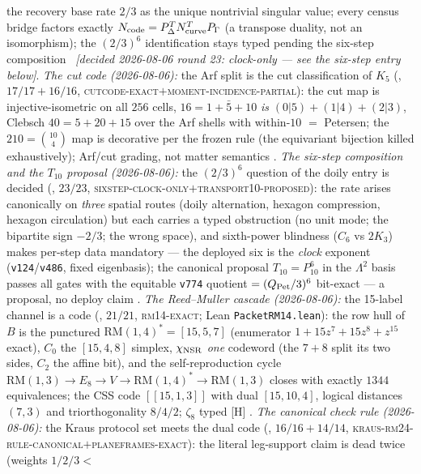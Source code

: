 \documentclass[11pt,a4paper]{article}
\theoremstyle{definition}
\begin{document}
\begin{keybox}
the recovery base rate $2/3$ as the unique nontrivial singular
value; every census bridge factors exactly
$N_{\rm code}=P_\Delta^{T}N_{\rm curve}^{T}P_\Gamma$ (a transpose
duality, not an isomorphism); the $(2/3)^6$ identification stays
typed pending the six-step composition \mE\ \emph{[decided
2026-08-06 round 23: clock-only --- see the six-step entry
below]}.
\emph{The cut code (2026-08-06):} the Arf split is the cut
classification of $K_5$
(, $17/17+16/16$,
\textsc{cutcode-exact}$+$\textsc{moment-incidence-partial}): the
cut map is injective-isometric on all $256$ cells,
$16=1+\bar5+10$ \emph{is} $(0|5)+(1|4)+(2|3)$, Clebsch
$40=5+20+15$ over the Arf shells with within-$10$ $=$ Petersen;
the $210=\binom{10}{4}$ map is decorative per the frozen rule
(the equivariant bijection killed exhaustively); Arf/cut grading,
not matter semantics \mE.
\emph{The six-step composition and the $T_{10}$ proposal
(2026-08-06):} the $(2/3)^6$ question of the doily entry is
decided
(, $23/23$,
\textsc{sixstep-clock-only}$+$\textsc{transport10-proposed}): the
rate arises canonically on \emph{three} spatial routes (doily
alternation, hexagon compression, hexagon circulation) but each
carries a typed obstruction (no unit mode; the bipartite sign
$-2/3$; the wrong space), and sixth-power blindness ($C_6$ vs
$2K_3$) makes per-step data mandatory --- the deployed six is the
\emph{clock} exponent (\texttt{v124}/\texttt{v486}, fixed
eigenbasis); the canonical proposal $T_{10}=P_{10}^6$ in the
$\Lambda^2$ basis passes all gates with the equitable
\texttt{v774} quotient $=(Q_{\rm Pet}/3)^6$ bit-exact --- a
proposal, no deploy claim \mE.
\emph{The Reed--Muller cascade (2026-08-06):} the 15-label
channel is a code
(, $21/21$,
\textsc{rm14-exact}; Lean \texttt{PacketRM14.lean}): the row hull
of $B$ is the punctured $\mathrm{RM}(1,4)^*=[15,5,7]$ (enumerator
$1+15z^7+15z^8+z^{15}$ exact), $C_0$ the $[15,4,8]$ simplex,
$\chi_{\rm NSR}$ \emph{one} codeword (the $7{+}8$ split its two
sides, $C_2$ the affine bit), and the self-reproduction cycle
$\mathrm{RM}(1,3)\to E_8\to V\to\mathrm{RM}(1,4)^*\to
\mathrm{RM}(1,3)$ closes with exactly $1344$ equivalences; the
CSS code $[[15,1,3]]$ with dual $[15,10,4]$, logical distances
$(7,3)$ and triorthogonality $8/4/2$; $\zeta_8$ typed [H] \mE.
\emph{The canonical check rule (2026-08-06):} the Kraus protocol
set meets the dual code
(, $16/16+14/14$,
\textsc{kraus-rm24-rule-canonical}$+$\textsc{planeframes-exact}):
the literal leg-support claim is dead twice (weights $1/2/3<$

\end{keybox}
\end{document}
